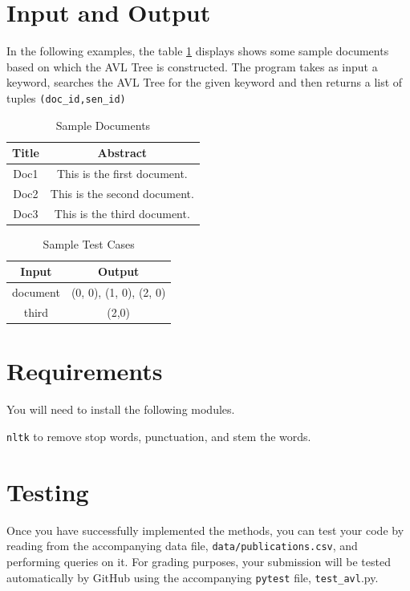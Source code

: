 \documentclass[addpoints]{exam}
\begin{document}
\section*{Input and Output}
In the following examples, the table \ref{tab:inp} displays shows some sample documents based on which the AVL Tree is constructed. The program takes as input a keyword, searches the AVL Tree for the given keyword and then returns a list of tuples \texttt{(doc\_id,sen\_id)}
\begin{table}[h!]
  \centering
  \begin{tabular}{|c|c|}
    \hline
    Title & Abstract \\ \hline
    Doc1 & This is the first document. \\ \hline
    Doc2 & This is the second document.\\ \hline
    Doc3 & This is the third document. \\ \hline
  \end{tabular}
  \caption{Sample Documents}
  \label{tab:inp}
\end{table}
\newpage
\begin{table}[h!]
  \centering
  \begin{tabular}{|c|c|}
    \hline
    Input & Output \\ \hline
    document &  (0, 0), (1, 0), (2, 0) \\ \hline
    third & (2,0) \\ \hline
  \end{tabular}
  \caption{Sample Test Cases}
  \label{tab:test}
\end{table}

\section*{Requirements}

You will need to install the following modules.
\item [\texttt{nltk}]  to remove stop words, punctuation, and stem the words.



\section*{Testing}
Once you have successfully implemented the methods, you can test your code by reading from the accompanying data file, \texttt{data/publications.csv}, and performing queries on it. For grading purposes, your submission will
be tested automatically by GitHub using the accompanying \texttt{pytest} file, \texttt{test\_avl}.py.
\end{document}
